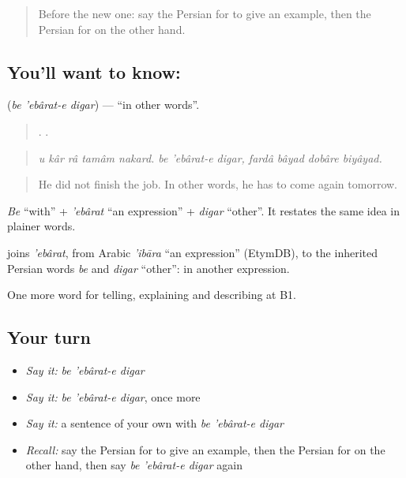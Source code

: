 \label{lesson:FA-C367-be-ebarat-e-digar}



\begin{quote}
Before the new one: say the Persian for to give an example, then the Persian for on the other hand.
\end{quote}

\subsection*{You'll want to know:   }
\textbf{  } (\emph{be 'ebârat-e digar}) — \textquotedblleft{}in other words\textquotedblright{}.

\begin{quote}
    .       .
\end{quote}

\begin{quote}
\emph{u kâr râ tamâm nakard. be 'ebârat-e digar, fardâ bâyad dobâre biyâyad.}
\end{quote}

\begin{quote}
He did not finish the job. In other words, he has to come again tomorrow.
\end{quote}

\emph{Be} \textquotedblleft{}with\textquotedblright{} + \emph{'ebârat} \textquotedblleft{}an expression\textquotedblright{} + \emph{digar} \textquotedblleft{}other\textquotedblright{}. It restates the same idea in plainer words.

\begin{cousinweb}
\textbf{  } joins \emph{'ebârat}, from Arabic \emph{'ibāra} \textquotedblleft{}an expression\textquotedblright{} (EtymDB), to the inherited Persian words \emph{be} and \emph{digar} \textquotedblleft{}other\textquotedblright{}: in another expression.
\end{cousinweb}

\begin{grammarlens}[title={What you've built}]
One more word for telling, explaining and describing at B1.
\end{grammarlens}

\subsection*{Your turn}
\begin{itemize}
\raggedright
  \item \emph{Say it:} \emph{be 'ebârat-e digar}
  \item \emph{Say it:} \emph{be 'ebârat-e digar}, once more
  \item \emph{Say it:} a sentence of your own with \emph{be 'ebârat-e digar}
  \item \emph{Recall:} say the Persian for to give an example, then the Persian for on the other hand, then say \emph{be 'ebârat-e digar} again
\end{itemize}

